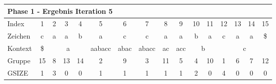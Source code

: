\begin{table}[H]
\centering
\begin{adjustbox}{max width=\textwidth}
\begin{tabular}{lccccccccccccccc}
\multicolumn{16}{l}{Phase 1 - Ergebnis Iteration 5}                                                                                                                                                                                                                                                                                                                                                                        \\ \hline
\multicolumn{1}{l|}{Index}   & 1                       & 2                         & 3                         & 4                       & 5                                                   & 6                         & \cellcolor[HTML]{\green}7  & 8                         & 9                        & 10 & 11                      & 12 & 13                        & 14                        & 15  \\
\multicolumn{1}{l|}{Zeichen} & c                       & a                         & a                         & b                       & a                                                   & c                         & c                          & a                         & a                        & b  & a                       & c  & a                         & a                         & \$  \\ \cline{1-16}
\multicolumn{1}{l|}{Kontext} & \multicolumn{1}{c|}{\$} & \multicolumn{3}{c|}{a}                                                          & \multicolumn{1}{c|}{\cellcolor[HTML]{\red}aabacc} & \multicolumn{1}{c|}{abac} & \multicolumn{1}{c|}{abacc} & \multicolumn{1}{c|}{ac}   & \multicolumn{1}{c|}{acc} & \multicolumn{2}{c|}{b}       & \multicolumn{4}{c}{c}                                            \\
\multicolumn{1}{l|}{Gruppe}      & \multicolumn{1}{c|}{15} & 8                         & 13                        & \multicolumn{1}{c|}{14} & \multicolumn{1}{c|}{\cellcolor[HTML]{\red}2}      & \multicolumn{1}{c|}{9}    & \multicolumn{1}{c|}{3}     & \multicolumn{1}{c|}{11}   & \multicolumn{1}{c|}{5}   & 4  & \multicolumn{1}{c|}{10} & 1  & 6                         & 7                         & 12  \\
\multicolumn{1}{l|}{GSIZE}   & \multicolumn{1}{c|}{1}  & \cellcolor[HTML]{\red}3 & 0                         & \multicolumn{1}{c|}{0}  & \multicolumn{1}{c|}{\cellcolor[HTML]{\red}1}      & \multicolumn{1}{c|}{1}    & \multicolumn{1}{c|}{1}     & \multicolumn{1}{c|}{1}    & \multicolumn{1}{c|}{1}   & 2  & \multicolumn{1}{c|}{0}  & 4  & 0                         & 0                         & 0   \\

\end{tabular}
\end{adjustbox}
\end{table}
